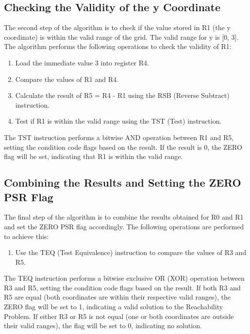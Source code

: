 \subsection{Checking the Validity of the y Coordinate}

The second step of the algorithm is to check if the value stored in R1 (the y coordinate) is within the valid range of the grid. The valid range for y is [0, 3]. The algorithm performs the following operations to check the validity of R1:

\begin{enumerate}
    \item Load the immediate value 3 into register R4.
    \item Compare the values of R1 and R4.
    \item Calculate the result of R5 = R4 - R1 using the RSB (Reverse Subtract) instruction.
    \item Test if R1 is within the valid range using the TST (Test) instruction.
\end{enumerate}

The TST instruction performs a bitwise AND operation between R1 and R5, setting the condition code flags based on the result. If the result is 0, the ZERO flag will be set, indicating that R1 is within the valid range.

\subsection{Combining the Results and Setting the ZERO PSR Flag}

The final step of the algorithm is to combine the results obtained for R0 and R1 and set the ZERO PSR flag accordingly. The following operations are performed to achieve this:

\begin{enumerate}
    \item Use the TEQ (Test Equivalence) instruction to compare the values of R3 and R5.
\end{enumerate}

The TEQ instruction performs a bitwise exclusive OR (XOR) operation between R3 and R5, setting the condition code flags based on the result. If both R3 and R5 are equal (both coordinates are within their respective valid ranges), the ZERO flag will be set to 1, indicating a valid solution to the Reachability Problem. If either R3 or R5 is not equal (one or both coordinates are outside their valid ranges), the flag will be set to 0, indicating no solution.



